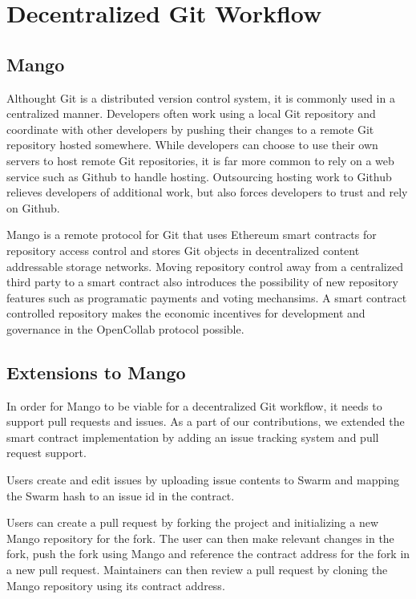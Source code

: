 \section{Decentralized Git Workflow}
\label{sec:git}

\subsection{Mango}

Althought Git is a distributed version control system, it is commonly used in a
centralized manner. Developers often work using a local Git repository and
coordinate with other developers by pushing their changes to a remote Git
repository hosted somewhere. While developers can choose to use their own
servers to host remote Git repositories, it is far more common to rely on a web
service such as Github to handle hosting. Outsourcing hosting work to Github
relieves developers of additional work, but also forces developers to trust and
rely on Github.

Mango is a remote protocol for Git that uses Ethereum smart contracts for repository
access control and stores Git objects in decentralized content addressable storage
networks\cite{mango}. Moving repository control away from a centralized third party to a smart
contract also introduces the possibility of new repository features such as programatic
payments and voting mechansims. A smart contract controlled repository makes the
economic incentives for development and governance in the OpenCollab protocol possible.

\subsection{Extensions to Mango}

In order for Mango to be viable for a decentralized Git workflow, it needs
to support pull requests and issues. As a part of our contributions, we
extended the  smart contract implementation by adding an
issue tracking system and pull request support.

Users create and edit issues by uploading issue contents to Swarm and mapping
the Swarm hash to an issue id in the contract.

Users can create a pull request by forking the project and initializing
a new Mango repository for the fork. The user can then make relevant changes in
the fork, push the fork using Mango and reference the 
contract address for the fork in a new pull request. Maintainers can then review
a pull request by cloning the Mango repository using its contract address.

